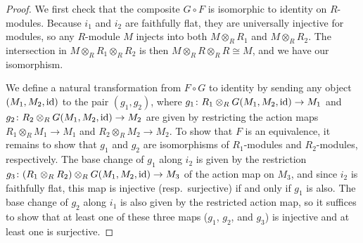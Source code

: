 \begin{proof}
We first check that the composite $G \circ F$ is isomorphic to identity on $R$-modules. Because $i_1$ and $i_2$ are faithfully flat, they are universally injective for modules, so any $R$-module $M$ injects into both $M \otimes_{R} R_1$ and $M \otimes_{R} R_2$. The intersection in $M \otimes_{R} R_1 \otimes_{R} R_2$ is then $M \otimes_{R} R \otimes_{R} R \cong M$, and we have our isomorphism.

We define a natural transformation from $F \circ G$ to identity by sending any object $(M_1, M_2, {\rm id})$ to the pair $(g_1,g_2)$, where $g_1\colon R_1 \otimes_{R} G(M_1,M_2,{\rm id}) \to M_1$ and $g_2\colon R_2 \otimes_{R} G(M_1,M_2,{\rm id}) \to M_2$ are given by restricting the action maps $R_1 \otimes_{R} M_1 \to M_1$ and $R_2 \otimes_{R} M_2 \to M_2$. To show that $F$ is an equivalence, it remains to show that $g_1$ and $g_2$ are isomorphisms of $R_1$-modules and $R_2$-modules, respectively. The base change of $g_1$ along $i_2$ is given by the restriction $g_3\colon (R_1 \otimes_{R} R_2) \otimes_{R} G(M_1,M_2,{\rm id}) \to M_3$ of the action map on $M_3$, and since $i_2$ is faithfully flat, this map is injective (resp.~surjective) if and only if $g_1$ is also. The base change of $g_2$ along $i_1$ is also given by the restricted action map, so it suffices to show that at least one of these three maps ($g_1$, $g_2$, and $g_3$) is injective and at least one is surjective.


\end{proof}
